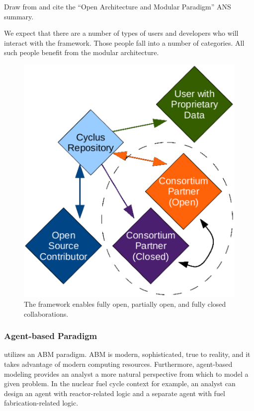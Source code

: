 Draw from and cite the ``Open Architecture and Modular Paradigm'' ANS summary.

We expect that there are a number of types of users and developers who will 
interact with the \Cyclus framework. Those people fall into a number of 
categories. All such people benefit from the modular architecture. 

\begin{figure}[htbp!]
\begin{center}
\includegraphics{./images/modifiedopen.eps}
\end{center}
\caption{The \Cyclus framework enables fully open, partially open, and fully 
closed collaborations.}
\label{fig:modifiedopen}
\end{figure}

\subsubsection{Agent-based Paradigm}

\Cyclus utilizes an \gls{ABM} paradigm.  \gls{ABM} is modern, sophisticated, 
true to reality, and it takes advantage of modern computing resources. 
Furthermore, agent-based modeling provides an analyst a more natural 
perspective from which to model a given problem. In the nuclear fuel cycle 
context for example, an analyst can design an agent with reactor-related logic 
and a separate agent with fuel fabrication-related logic.  

